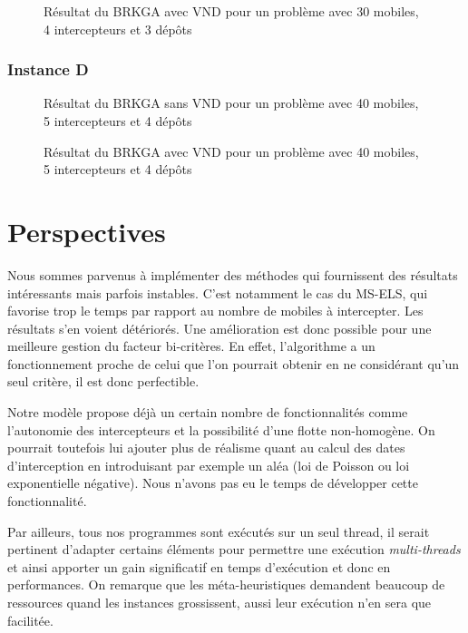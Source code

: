                 \begin{figure}[H]
                	
                \caption{Résultat du BRKGA avec VND pour un problème avec 30 mobiles, 4 intercepteurs et 3 dépôts}
				\label{fig:30m4i3d-avecvnd}
				\end{figure}
				
            \subsubsection{Instance D}
            	\begin{figure}[H]
                	
                \caption{Résultat du BRKGA sans VND pour un problème avec 40 mobiles, 5 intercepteurs et 4 dépôts}
				\label{fig:40m5i4d-sansvnd}
                \end{figure}
                
                \begin{figure}[H]
                	
                \caption{Résultat du BRKGA avec VND pour un problème avec 40 mobiles, 5 intercepteurs et 4 dépôts}
				\label{fig:40m5i4d-avecvnd}
				\end{figure}
				
    \newpage
    \section{Perspectives}

        Nous sommes parvenus à implémenter des méthodes qui fournissent des résultats intéressants mais parfois instables. C'est notamment le cas du MS-ELS, qui favorise trop le temps par rapport au nombre de mobiles à intercepter. Les résultats s'en voient détériorés. Une amélioration est donc possible pour une meilleure gestion du facteur bi-critères. En effet, l'algorithme a un fonctionnement proche de celui que l'on pourrait obtenir en ne considérant qu'un seul critère, il est donc perfectible.

        Notre modèle propose déjà un certain nombre de fonctionnalités comme l'autonomie des intercepteurs et la possibilité d'une flotte non-homogène. On pourrait toutefois lui ajouter plus de réalisme quant au calcul des dates d'interception en introduisant par exemple un aléa (loi de Poisson ou loi exponentielle négative). Nous n'avons pas eu le temps de développer cette fonctionnalité.

        Par ailleurs, tous nos programmes sont exécutés sur un seul thread, il serait pertinent d'adapter certains éléments pour permettre une exécution \emph{multi-threads} et ainsi apporter un gain significatif en temps d'exécution et donc en performances. On remarque que les méta-heuristiques demandent beaucoup de ressources quand les instances grossissent, aussi leur exécution n'en sera que facilitée.
